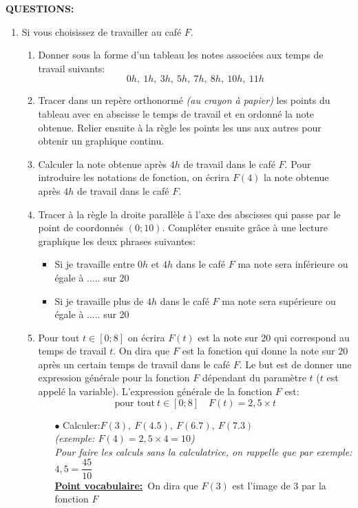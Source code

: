 \documentclass[a4paper,11pt]{article}
\theoremstyle{definition}
\begin{document}
		\textbf{QUESTIONS:}

	
	\begin{enumerate}
		\item Si vous choisissez de travailler au café $F$.
		\begin{enumerate}
			\item Donner sous la forme d'un tableau les notes associées aux temps de travail suivants: $$0h,~1h,~3h,~5h,~7h,~8h,~10h,~11h$$
			\item Tracer dans un repère orthonormé \textit{(au crayon à papier)} les points du tableau avec en abscisse le temps de travail et en ordonné la note obtenue. Relier ensuite à la règle les points les uns aux autres pour obtenir un graphique continu. 
			\item Calculer la note obtenue après $4h$ de travail dans le café $F$. Pour introduire les notations de fonction, on écrira $F(4)$ la note obtenue après $4h$ de travail dans le café $F$. 
			\item Tracer à la règle la droite parallèle à l'axe des abscisses qui passe par le point de coordonnés $(0;10)$. Compléter ensuite grâce à une lecture graphique les deux phrases suivantes:
			\begin{itemize}
				\item Si je travaille entre $0h$ et $4h$ dans le café $F$ ma note sera inférieure ou égale à ..... sur 20
				\item Si je travaille plus de $4h$ dans le café $F$ ma note sera supérieure ou égale à ..... sur 20
			\end{itemize}
			\item Pour tout $t\in[0;8]$ on écrira $F(t)$ est la note sur $20$ qui correspond au temps de travail $t$. On dira que $F$ est la fonction qui donne la note sur $20$ après un certain temps de travail dans le café $F$. Le but est de donner une expression générale pour la fonction $F$ dépendant du paramètre $t$ ($t$ est appelé la variable). L'expression générale de la fonction $F$ est:
			$$\text{pour tout}~t\in[0;8]\quad F(t)=2,5\times t$$ 
			
		\begin{itemize}
			\item[$\bullet$] Calculer:\quad $F(3),~F(4.5),~F(6.7),~F(7.3)$\\
		\textit{	(exemple: $F(4)=2,5\times 4=10$)}\\
		\textit{Pour faire les calculs sans la calculatrice, on rappelle que par exemple: \quad $4,5= \dfrac{45}{10}$}\\
		\newpage
		\chead{}\renewcommand{\headrulewidth}{0.4pt}\renewcommand{\footrulewidth}{0.4pt}
		\textbf{\underline{Point vocabulaire:}}~On dira que $F(3)$ est l'image de $3$ par la fonction $F$
			

\end{itemize}
\end{enumerate}
\end{enumerate}
\end{document}
